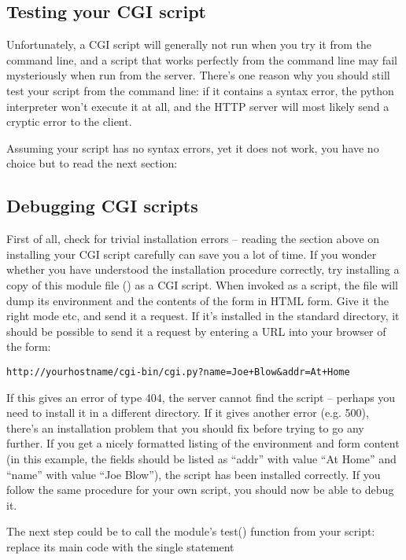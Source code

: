 \subsection{Testing your CGI script}

Unfortunately, a CGI script will generally not run when you try it
from the command line, and a script that works perfectly from the
command line may fail mysteriously when run from the server.  There's
one reason why you should still test your script from the command
line: if it contains a syntax error, the python interpreter won't
execute it at all, and the HTTP server will most likely send a cryptic
error to the client.

Assuming your script has no syntax errors, yet it does not work, you
have no choice but to read the next section:


\subsection{Debugging CGI scripts}

First of all, check for trivial installation errors -- reading the
section above on installing your CGI script carefully can save you a
lot of time.  If you wonder whether you have understood the
installation procedure correctly, try installing a copy of this module
file () as a CGI script.  When invoked as a script, the file
will dump its environment and the contents of the form in HTML form.
Give it the right mode etc, and send it a request.  If it's installed
in the standard  directory, it should be possible to send it a
request by entering a URL into your browser of the form:

\bcode\begin{verbatim}
http://yourhostname/cgi-bin/cgi.py?name=Joe+Blow&addr=At+Home
\end{verbatim}\ecode
%
If this gives an error of type 404, the server cannot find the script
-- perhaps you need to install it in a different directory.  If it
gives another error (e.g.  500), there's an installation problem that
you should fix before trying to go any further.  If you get a nicely
formatted listing of the environment and form content (in this
example, the fields should be listed as ``addr'' with value ``At Home''
and ``name'' with value ``Joe Blow''), the  script has been
installed correctly.  If you follow the same procedure for your own
script, you should now be able to debug it.

The next step could be to call the  module's test() function from
your script: replace its main code with the single statement

